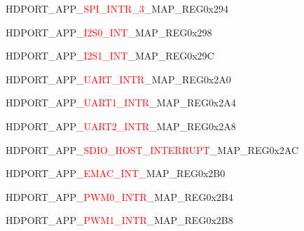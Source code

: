\vspace{-3em}
\begin{register}{H}{DPORT\_APP\_\textcolor{red}{SPI\_INTR\_3}\_MAP\_REG}{0x294}\label{regdesc:APPSPIINTR3MAPREG}
\end{register}
\vspace{-3em}
\begin{register}{H}{DPORT\_APP\_\textcolor{red}{I2S0\_INT}\_MAP\_REG}{0x298}\label{regdesc:APPI2S0INTMAPREG}
\end{register}
\vspace{-3em}
\begin{register}{H}{DPORT\_APP\_\textcolor{red}{I2S1\_INT}\_MAP\_REG}{0x29C}\label{regdesc:APPI2S1INTMAPREG}
\end{register}
\vspace{-3em}
\begin{register}{H}{DPORT\_APP\_\textcolor{red}{UART\_INTR}\_MAP\_REG}{0x2A0}\label{regdesc:APPUARTINTRMAPREG}
\end{register}
\vspace{-3em}
\begin{register}{H}{DPORT\_APP\_\textcolor{red}{UART1\_INTR}\_MAP\_REG}{0x2A4}\label{regdesc:APPUART1INTRMAPREG}
\end{register}
\vspace{-3em}
\begin{register}{H}{DPORT\_APP\_\textcolor{red}{UART2\_INTR}\_MAP\_REG}{0x2A8}\label{regdesc:APPUART2INTRMAPREG}
\end{register}
\vspace{-3em}
\begin{register}{H}{DPORT\_APP\_\textcolor{red}{SDIO\_HOST\_INTERRUPT}\_MAP\_REG}{0x2AC}\label{regdesc:APPSDIOHOSTINTERRUPTMAPREG}
\end{register}
\vspace{-3em}
\begin{register}{H}{DPORT\_APP\_\textcolor{red}{EMAC\_INT}\_MAP\_REG}{0x2B0}\label{regdesc:APPEMACINTMAPREG}
\end{register}
\vspace{-3em}
\begin{register}{H}{DPORT\_APP\_\textcolor{red}{PWM0\_INTR}\_MAP\_REG}{0x2B4}\label{regdesc:APPPWM0INTRMAPREG}
\end{register}
\vspace{-3em}
\begin{register}{H}{DPORT\_APP\_\textcolor{red}{PWM1\_INTR}\_MAP\_REG}{0x2B8}\label{regdesc:APPPWM1INTRMAPREG}
\end{register}
